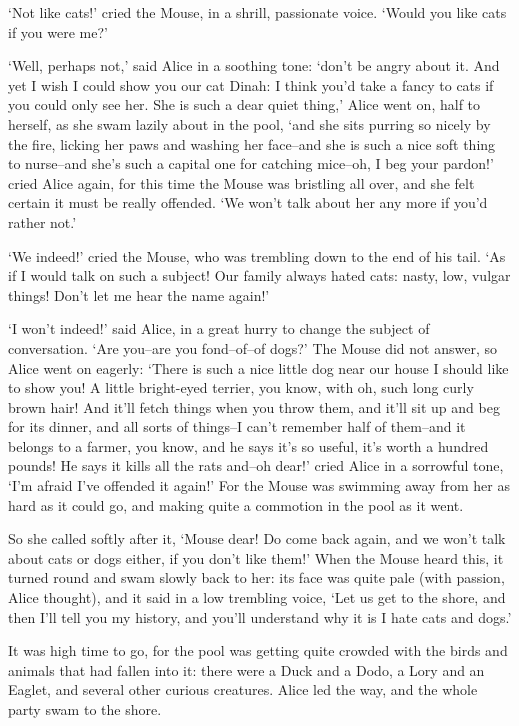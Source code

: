 \documentclass[statementpaper,twoside,openany]{memoir}
\begin{document}
`Not like cats!' cried the Mouse, in a shrill, passionate voice. `Would you like cats if you were me?'

`Well, perhaps not,' said Alice in a soothing tone: `don't be angry about it. And yet I wish I could show you our cat Dinah: I think you'd take a fancy to cats if you could only see her. She is such a dear quiet thing,' Alice went on, half to herself, as she swam lazily about in the pool, `and she sits purring so nicely by the fire, licking her paws and washing her face--and she is such a nice soft thing to nurse--and she's such a capital one for catching mice--oh, I beg your pardon!' cried Alice again, for this time the Mouse was bristling all over, and she felt certain it must be really offended. `We won't talk about her any more if you'd rather not.'

`We indeed!' cried the Mouse, who was trembling down to the end of his tail. `As if I would talk on such a subject! Our family always hated cats: nasty, low, vulgar things! Don't let me hear the name again!'

`I won't indeed!' said Alice, in a great hurry to change the subject of conversation. `Are you--are you fond--of--of dogs?' The Mouse did not answer, so Alice went on eagerly: `There is such a nice little dog near our house I should like to show you! A little bright-eyed terrier, you know, with oh, such long curly brown hair! And it'll fetch things when you throw them, and it'll sit up and beg for its dinner, and all sorts of things--I can't remember half of them--and it belongs to a farmer, you know, and he says it's so useful, it's worth a hundred pounds! He says it kills all the rats and--oh dear!' cried Alice in a sorrowful tone, `I'm afraid I've offended it again!' For the Mouse was swimming away from her as hard as it could go, and making quite a commotion in the pool as it went.

So she called softly after it, `Mouse dear! Do come back again, and we won't talk about cats or dogs either, if you don't like them!' When the Mouse heard this, it turned round and swam slowly back to her: its face was quite pale (with passion, Alice thought), and it said in a low trembling voice, `Let us get to the shore, and then I'll tell you my history, and you'll understand why it is I hate cats and dogs.'

It was high time to go, for the pool was getting quite crowded with the birds and animals that had fallen into it: there were a Duck and a Dodo, a Lory and an Eaglet, and several other curious creatures. Alice led the way, and the whole party swam to the shore.
\end{document}
